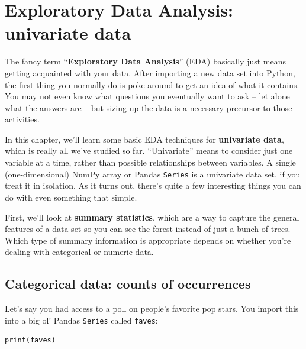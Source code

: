 
\chapter{Exploratory Data Analysis: univariate data}
\label{ch:edaUnivariate}


The fancy term ``\textbf{Exploratory Data Analysis}'' (EDA) basically just
means getting acquainted with your data. After importing a new data set into
Python, the first thing you normally do is poke around to get an idea of what
it contains. You may not even know what questions you eventually want to ask --
let alone what the answers are -- but sizing up the data is a necessary
precursor to those activities.


In this chapter, we'll learn some basic EDA techniques for \textbf{univariate
data}, which is really all we've studied so far. ``Univariate'' means to
consider just one variable at a time, rather than possible relationships
between variables. A single (one-dimensional) NumPy array or Pandas
\texttt{Series} is a univariate data set, if you treat it in isolation. As it
turns out, there's quite a few interesting things you can do with even
something that simple.



First, we'll look at \textbf{summary statistics}, which are a way to capture
the general features of a data set so you can see the forest instead of just a
bunch of trees. Which type of summary information is appropriate depends on
whether you're dealing with categorical or numeric data.

\section{Categorical data: counts of occurrences}

\label{categoricalDataValueCounts}


Let's say you had access to a poll on people's favorite pop stars. You import
this into a big ol' Pandas \texttt{Series} called \texttt{faves}:

\begin{Verbatim}[fontsize=\scriptsize,samepage=true,frame=single,framesep=3mm]
print(faves)
\end{Verbatim}

